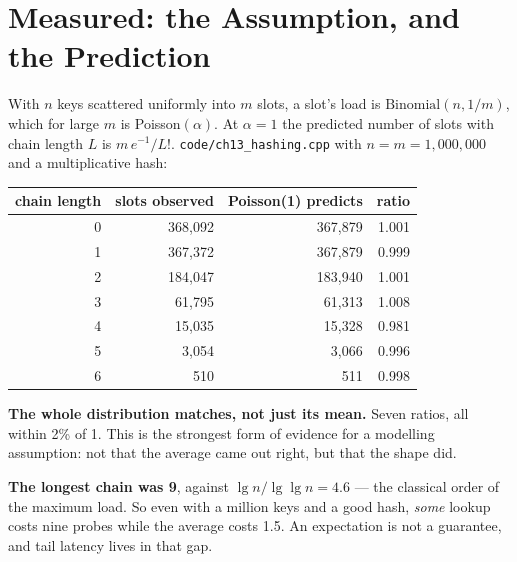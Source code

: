 \section{Measured: the Assumption, and the Prediction}

\begin{worked}
With $n$ keys scattered uniformly into $m$ slots, a slot's load is
$\mathrm{Binomial}(n, 1/m)$, which for large $m$ is Poisson$(\alpha)$. At
$\alpha = 1$ the predicted number of slots with chain length $L$ is
$m\,e^{-1}/L!$. \texttt{code/ch13\_hashing.cpp} with
$n = m = 1{,}000{,}000$ and a multiplicative hash:

\begin{center}
\begin{tabular}{@{}rrrr@{}}
\toprule
\rowcolor{primary!15}
chain length & slots observed & Poisson(1) predicts & ratio \\
\midrule
0 & 368{,}092 & 367{,}879 & 1.001 \\
1 & 367{,}372 & 367{,}879 & 0.999 \\
2 & 184{,}047 & 183{,}940 & 1.001 \\
3 &  61{,}795 &  61{,}313 & 1.008 \\
4 &  15{,}035 &  15{,}328 & 0.981 \\
5 &   3{,}054 &   3{,}066 & 0.996 \\
6 &     510 &     511 & 0.998 \\
\bottomrule
\end{tabular}
\end{center}

\smallskip
\textbf{The whole distribution matches, not just its mean.} Seven ratios, all
within 2\% of 1. This is the strongest form of evidence for a modelling
assumption: not that the average came out right, but that the shape did.

\smallskip
\textbf{The longest chain was 9}, against $\lg n / \lg\lg n = 4.6$ --- the
classical order of the maximum load. So even with a million keys and a good
hash, \emph{some} lookup costs nine probes while the average costs 1.5. An
expectation is not a guarantee, and tail latency lives in that gap.
\end{worked}


